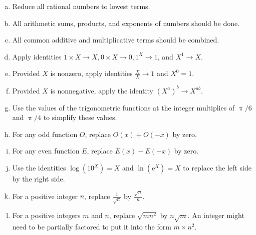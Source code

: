 \documentclass[12pt,fleqn]{article}
\newenvironment{alphalist}{
  \begin{enumerate}[(a)]
    \addtolength{\itemsep}{-0.5\itemsep}}
  {\end{enumerate}}
\begin{document}
\begin{tcolorbox}
   \begin{alphalist}
   
   \item  Reduce all rational numbers to lowest terms.
   
   \item All arithmetic sums, products, and exponents of numbers should be done.
   
   \item All common additive and multiplicative terms should be combined.
   
   \item Apply identities  $1 \times X  \to  X,  0 \times  X \to  0, 1^X \to  1$, and  $X^1  \to X$.
   
   \item Provided $X$ is  nonzero,  apply identities $\frac{X}{X} \to  1$ and $X^0 = 1$.
   
   \item Provided $X$ is  nonnegative, apply the identity $\left(X^a\right)^b \to  X^{a b}$.
   
   \item Use the values of the trigonometric functions at the integer multiplies of $\uppi/6$ and $\uppi/4$ to simplify these values.
   
   \item For any odd function $O$, replace $O(x) + O(-x)$ by zero. 
   
   \item For any even function $E$, replace $E(x) - E(-x)$ by zero.
   
   \item Use the identities $\log(10^X) = X$ and $\ln(\mathrm{e}^X) = X$ 
   to replace the left side by the right side.
   
   \item For a positive integer $n$, replace $\frac{1}{\sqrt{n}}$ by $\frac{\sqrt{n}}{n}$.
   
   \item For a positive integers $m$ and $n$, replace $\sqrt{m n^2}$ by $n \sqrt{m}$. 
   An integer might need to be partially factored to put it into the form
   $m \times n^2$.

   \end{alphalist}
   \end{tcolorbox}

      
\end{document}
